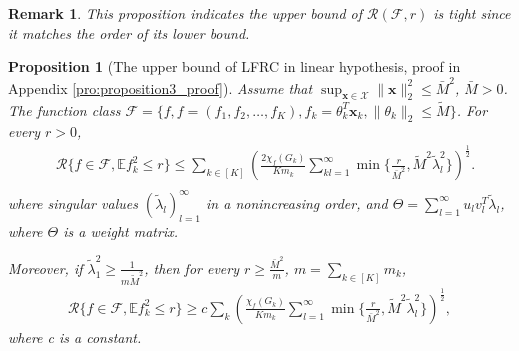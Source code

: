 \documentclass{article}
\def\vx{{\mathbf{x}}}
\def\eE{\mathbb{E}}
\newtheorem{proposition}{Proposition}
\newtheorem*{remark}{Remark}
\begin{document}
\begin{remark}
    This proposition indicates the upper bound of $\mathcal{R}(\mathcal{F},r)$ is tight since it matches the order of its lower bound.
\end{remark}

\begin{proposition}[The upper bound of LFRC in linear hypothesis, proof in Appendix \ref{pro:proposition3_proof}]
\label{thm:linear upper bound} Assume that $\sup _{\vx \in \mathcal{X}} \|\vx\|_2^2 \leq \bar{M}^2$, $\bar{M} >0$. The function class $\mathcal{F} = \{ f, f = (f_1,f_2,\dots,f_K), f_k = \theta_k^T \vx_k, \|\theta_k\|_2 \leq \widetilde{M} \}$. For every $ r >0$, 
    \begin{align*}
       & \mathcal{R}\{ f \in \mathcal{F}, \eE f_k^2 \leq r \} \leq \sum _{k \in [K]} \left( \frac{2 \chi_f(G_k)}{K m_k} \sum _{kl = 1} ^{\infty} \min \{ \frac{r}{\bar{M}^2} , \widetilde{M}^2 \widetilde{\lambda} ^2_{l} \} \right)^ {\frac{1}{2}}. \\
    \end{align*}
where singular values $(\widetilde{\lambda}_l)_{l=1}^{\infty}$ in a nonincreasing order, and $\Theta = \sum_{l=1}^{\infty}u_l v_l^T \widetilde{\lambda}_l$, where $\Theta$ is a weight matrix. 

Moreover, if $\widetilde{\lambda}_1^2 \geq \frac{1}{m \widetilde{M}^2}$, then for every $r \geq \frac{\bar{M}^2}{m}$, $m = \sum_{k \in [K]} m_k$,
\begin{align*}
     \mathcal{R}\{ f \in \mathcal{F}, \eE f_k^2 \leq r \}  
     \geq c \sum_k \left(  \frac{ \chi_f(G_k)}{K m_k} \sum _{l = 1} ^{\infty} \min \{ \frac{r}{\bar{M}^2} , \widetilde{M}^2 \widetilde{\lambda} ^2_{l} \} \right)^{\frac{1}{2}},    
\end{align*}
where c is a constant. 
\end{proposition}
\end{document}
